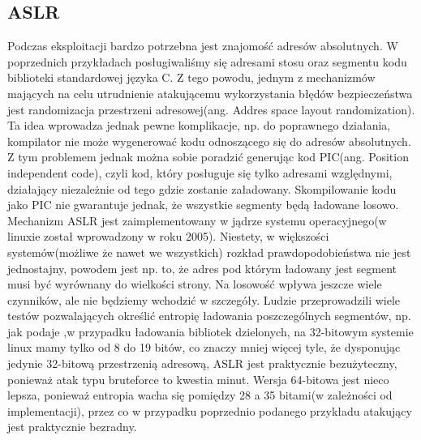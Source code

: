 \documentclass[polish]{kbk}
\begin{document}
\subsection{ASLR}
Podczas eksploitacji bardzo potrzebna jest znajomość adresów absolutnych. W poprzednich przykładach posługiwaliśmy się adresami stosu oraz segmentu kodu biblioteki standardowej 
języka C. Z tego powodu, jednym z mechanizmów mających na celu utrudnienie atakującemu 
wykorzystania błędów bezpieczeństwa jest randomizacja przestrzeni adresowej(ang. Addres space 
layout randomization). Ta idea wprowadza jednak pewne komplikacje, np. do poprawnego działania, 
kompilator nie może wygenerować kodu odnoszącego się do adresów absolutnych. Z tym problemem jednak można sobie poradzić generując kod PIC(ang. Position independent code), czyli kod, który posługuje się tylko adresami względnymi, działający niezależnie od tego gdzie zostanie załadowany. Skompilowanie kodu jako PIC nie gwarantuje jednak, że wszystkie segmenty będą ładowane losowo. Mechanizm ASLR jest zaimplementowany w jądrze systemu operacyjnego(w linuxie został wprowadzony w roku 2005). Niestety, w większości systemów(możliwe że nawet we wszystkich) rozkład prawdopodobieństwa nie jest jednostajny, powodem jest np. to, że adres pod którym ładowany jest segment musi być wyrównany do wielkości strony. Na losowość wpływa jeszcze wiele czynników, ale nie będziemy wchodzić w szczegóły. Ludzie przeprowadzili wiele testów pozwalających określić entropię ładowania poszczególnych segmentów, np. jak
podaje \cite{aslr},w przypadku ładowania bibliotek dzielonych, na 32-bitowym systemie linux mamy tylko od 8 do 19 bitów, co znaczy mniej więcej tyle, że dysponując jedynie 32-bitową przestrzenią adresową, ASLR jest praktycznie bezużyteczny, ponieważ atak typu bruteforce to kwestia minut. Wersja 64-bitowa jest nieco lepsza, ponieważ entropia wacha się pomiędzy 28 a 35 bitami(w zależności od implementacji), przez co w przypadku poprzednio podanego przykładu atakujący jest praktycznie bezradny.
\end{document}
